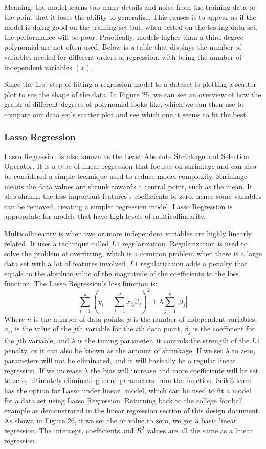 \documentclass[a4paper,12pt]{report}
\begin{document}
Meaning, the model learns too many details and noise from the training data to the point that it loses the ability to generalize. This causes it to appear as if the model is doing good on the training set but, when tested on the testing data set, the performance will be poor. Practically, models higher than a third-degree polynomial are not often used. Below is a table that displays the number of variables needed for different orders of regression, with  being the number of independent variables $(x)$.

Since the first step of fitting a regression model to a dataset is plotting a scatter plot to see the shape of the data. In Figure 25, we can see an overview of how the graph of different degrees of polynomial looks like, which we can then use to compare our data set’s scatter plot and see which one it seems to fit the best. 

\subsubsection{Lasso Regression}
Lasso Regression is also known as the Least Absolute Shrinkage and Selection Operator. It is a type of linear regression that focuses on shrinkage and can also be considered a simple technique used to reduce model complexity. Shrinkage means the data values are shrunk towards a central point, such as the mean. It also shrinks the less important features’s coefficients to zero, hence some variables can be removed, creating a simpler regression model. Lasso Regression is appropriate for models that have high levels of multicollinearity. 

Multicollinearity is when two or more independent variables are highly linearly related. It uses a technique called $L1$ regularization. Regularization is used to solve the problem of overfitting, which is a common problem when there is a large data set with a lot of features involved. $L1$ regularization adds a penalty that equals to the absolute value of the magnitude of the coefficients to the loss function. The Lasso Regression’s loss function is:
$$\sum_{i=1}^n\left(y_i-\sum_{j=1}^px_{ij}\beta_j\right)^2+\lambda\sum_{j=1}^p|\beta_j|$$
Where $n$ is the number of data points, $p$ is the number of independent variables, $x_{ij}$ is the value of the $j$th variable for the $i$th data point, $\beta_j$ is the coefficient for the $j$th variable, and $\lambda$ is the tuning parameter, it controls the strength of the $L1$ penalty, or it can also be known as the amount of shrinkage. If we set $\lambda$ to zero, parameters will not be eliminated, and it will basically be a regular linear regression. If we increase $\lambda$ the bias will increase and more coefficients will be set to zero, ultimately eliminating some parameters from the function. Scikit-learn has the option for Lasso under linear\_model, which can be used to fit a model for a data set using Lasso Regression. Returning back to the college football example as demonstrated in the linear regression section of this design document. As shown in Figure 26, if we set the or value to zero, we get a basic linear regression. The intercept, coefficients and $R^2$ values are all the same as a linear regression. 
\end{document}
